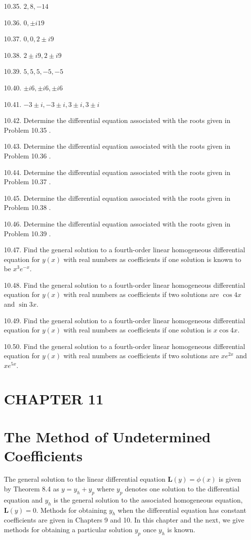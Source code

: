 \documentclass[10pt]{article}
\begin{document}
10.35. $2,8,-14$

10.36. $0, \pm i 19$

10.37. $0,0,2 \pm i 9$

10.38. $2 \pm i 9,2 \pm i 9$

10.39. $5,5,5,-5,-5$

10.40. $\pm i 6, \pm i 6, \pm i 6$

10.41. $-3 \pm i,-3 \pm i, 3 \pm i, 3 \pm i$

10.42. Determine the differential equation associated with the roots given in Problem 10.35 .

10.43. Determine the differential equation associated with the roots given in Problem 10.36 .

10.44. Determine the differential equation associated with the roots given in Problem 10.37 .

10.45. Determine the differential equation associated with the roots given in Problem 10.38 .

10.46. Determine the differential equation associated with the roots given in Problem 10.39 .

10.47. Find the general solution to a fourth-order linear homogeneous differential equation for $y(x)$ with real numbers as coefficients if one solution is known to be $x^{3} e^{-x}$.

10.48. Find the general solution to a fourth-order linear homogeneous differential equation for $y(x)$ with real numbers as coefficients if two solutions are $\cos 4 x$ and $\sin 3 x$.

10.49. Find the general solution to a fourth-order linear homogeneous differential equation for $y(x)$ with real numbers as coefficients if one solution is $x \cos 4 x$.

10.50. Find the general solution to a fourth-order linear homogeneous differential equation for $y(x)$ with real numbers as coefficients if two solutions are $x e^{2 x}$ and $x e^{5 x}$.

\section*{CHAPTER 11}
\section*{The Method of Undetermined Coefficients}
The general solution to the linear differential equation $\mathbf{L}(y)=\phi(x)$ is given by Theorem 8.4 as $y=y_{h}+y_{p}$ where $y_{p}$ denotes one solution to the differential equation and $y_{h}$ is the general solution to the associated homogeneous equation, $\mathbf{L}(y)=0$. Methods for obtaining $y_{h}$ when the differential equation has constant coefficients are given in Chapters 9 and 10. In this chapter and the next, we give methods for obtaining a particular solution $y_{p}$ once $y_{h}$ is known.
\end{document}
